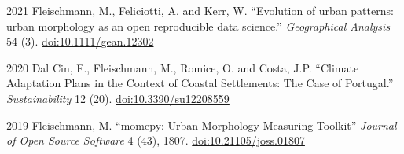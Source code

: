 \documentclass[11pt,a4paper]{report}
\begin{document}
\begin{tablist}
        \item[2021] \tab{}Fleischmann, M., Feliciotti, A. and Kerr, W. \enquote{Evolution of urban patterns: urban morphology as an open reproducible data science.} \textit{Geographical Analysis} 54 (3). \href{https://doi.org/10.1111/gean.12302}{doi:10.1111/gean.12302}

        \item[2020] \tab{}Dal Cin, F., Fleischmann, M., Romice, O. and Costa, J.P. \enquote{Climate Adaptation Plans in the Context of Coastal Settlements: The Case of Portugal.} \textit{Sustainability} 12 (20). \href{https://doi.org/10.3390/su12208559}{doi:10.3390/su12208559}



        \item[2019] \tab{}Fleischmann, M. \enquote{momepy: Urban Morphology Measuring Toolkit} \textit{Journal of Open Source Software} 4 (43), 1807. \href{https://doi.org/10.21105/joss.01807}{doi:10.21105/joss.01807}


    \end{tablist}



\end{document}
